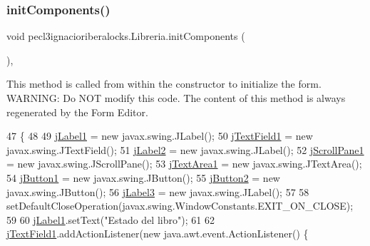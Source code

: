 \subsubsection{\texorpdfstring{init\+Components()}{initComponents()}}
{\footnotesize\ttfamily void pecl3ignacioriberalocks.\+Libreria.\+init\+Components (\begin{DoxyParamCaption}{ }\end{DoxyParamCaption})\hspace{0.3cm}{\ttfamily [inline]}, {\ttfamily [private]}}

This method is called from within the constructor to initialize the form. W\+A\+R\+N\+I\+NG\+: Do N\+OT modify this code. The content of this method is always regenerated by the Form Editor. 
\begin{DoxyCode}
47                                   \{
48 
49         \mbox{\hyperlink{classpecl3ignacioriberalocks_1_1_libreria_a6c9ed6af66a5a6313bb5d24403bd55a4}{jLabel1}} = \textcolor{keyword}{new} javax.swing.JLabel();
50         \mbox{\hyperlink{classpecl3ignacioriberalocks_1_1_libreria_ab0c60354cb4ed1ed51a374857bd3e706}{jTextField1}} = \textcolor{keyword}{new} javax.swing.JTextField();
51         \mbox{\hyperlink{classpecl3ignacioriberalocks_1_1_libreria_a8572be6fed6415a38a67dec66ee65efc}{jLabel2}} = \textcolor{keyword}{new} javax.swing.JLabel();
52         \mbox{\hyperlink{classpecl3ignacioriberalocks_1_1_libreria_a1542942d7ab23017f40dfa5d553322c9}{jScrollPane1}} = \textcolor{keyword}{new} javax.swing.JScrollPane();
53         \mbox{\hyperlink{classpecl3ignacioriberalocks_1_1_libreria_af512043c9f353245472d61b261517598}{jTextArea1}} = \textcolor{keyword}{new} javax.swing.JTextArea();
54         \mbox{\hyperlink{classpecl3ignacioriberalocks_1_1_libreria_aa1f6bf3a865167c265ce9c0c8baf8eca}{jButton1}} = \textcolor{keyword}{new} javax.swing.JButton();
55         \mbox{\hyperlink{classpecl3ignacioriberalocks_1_1_libreria_acc9d4371c4ed2d11e66f0c90303d10a5}{jButton2}} = \textcolor{keyword}{new} javax.swing.JButton();
56         \mbox{\hyperlink{classpecl3ignacioriberalocks_1_1_libreria_a5f3330e2cc3fb9dc95566b31f55d24da}{jLabel3}} = \textcolor{keyword}{new} javax.swing.JLabel();
57 
58         setDefaultCloseOperation(javax.swing.WindowConstants.EXIT\_ON\_CLOSE);
59 
60         \mbox{\hyperlink{classpecl3ignacioriberalocks_1_1_libreria_a6c9ed6af66a5a6313bb5d24403bd55a4}{jLabel1}}.setText(\textcolor{stringliteral}{"Estado del libro"});
61 
62         \mbox{\hyperlink{classpecl3ignacioriberalocks_1_1_libreria_ab0c60354cb4ed1ed51a374857bd3e706}{jTextField1}}.addActionListener(\textcolor{keyword}{new} java.awt.event.ActionListener() \{

\end{DoxyCode}
